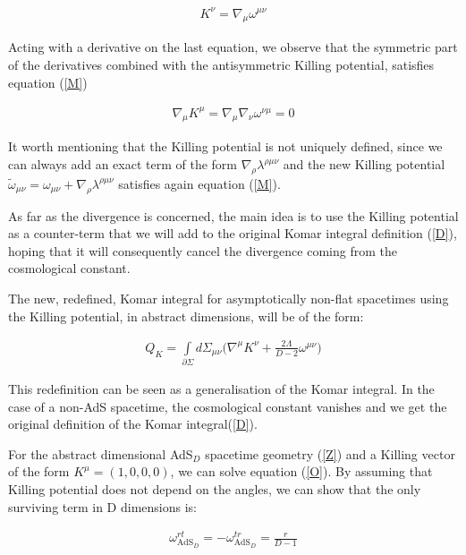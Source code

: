 \documentclass[a4paper,notitlepage]{report}
\begin{document}
\begin{align} \label{O}
K^\nu = \nabla_\mu \omega^{\mu\nu}
\end{align}

\vspace{0.5em}
Acting with a derivative on the last equation, we observe that the symmetric part of the derivatives combined with the antisymmetric Killing potential, satisfies equation (\ref{M})

\begin{align} \label{5}
\nabla_\mu K^\mu = \nabla_\mu \nabla_\nu \omega^{\nu\mu} = 0
\end{align}

\vspace{0.5em}
It worth mentioning that the Killing potential is not uniquely defined, since we can always add an exact term of the form $\nabla_\rho \lambda^{\rho\mu\nu}$ and the new Killing potential $\tilde{\omega}_{\mu\nu} = \omega_{\mu\nu} + \nabla_\rho \lambda^{\rho\mu\nu}$ satisfies again equation (\ref{M}).

As far as the divergence is concerned, the main idea is to use the Killing potential as a counter-term that we will add to the original Komar integral definition (\ref{D}), hoping that it will consequently cancel the divergence coming from the cosmological constant.

The new, redefined, Komar integral for asymptotically non-flat spacetimes using the Killing potential, in abstract dimensions, will be of the form:

\begin{align} \label{M1}
Q_K = \int\limits_{\partial\Sigma} d\Sigma_{\mu\nu} \Big( \nabla^\mu K^\nu + \frac{2\Lambda}{D-2} \omega^{\mu\nu} \Big)
\end{align}

\vspace{0.5em}
This redefinition can be seen as a generalisation of the Komar integral. In the case of a non-AdS spacetime, the cosmological constant vanishes and we get the original definition of the Komar integral(\ref{D}).

For the abstract dimensional AdS$_D$ spacetime geometry (\ref{Z}) and a Killing vector of the form $K^\mu = (1,0,0,0)$, we can solve equation (\ref{O}). By assuming that Killing potential does not depend on the angles, we can show that the only surviving term in D dimensions is:

\begin{align} \label{M2}
\omega^{rt}_{\text{AdS$_D$}} = -\omega^{tr}_{\text{AdS$_D$}} = \frac{r}{D-1}
\end{align}
\end{document}
